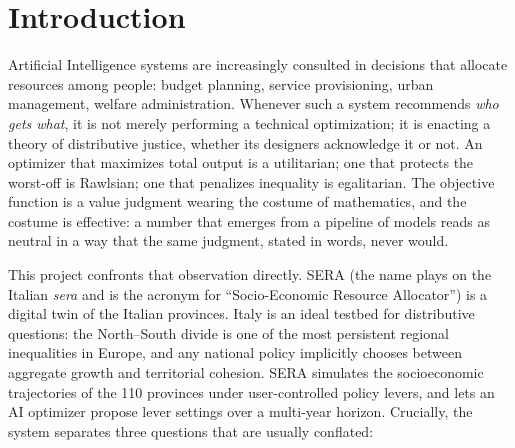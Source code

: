 \documentclass[11pt,a4paper]{article}
\begin{document}
\begin{abstract}
story that dissolved under replication as search luck. The NSGA-II search then
reveals that \emph{uniform} national policy cannot trade efficiency against
inequality at all, while a clustered search that can target regions makes the
trade-off reappear: distributional outcomes are determined by per-province
\emph{targeting}. Read in the dimension that motivated the choice of Italy
(the North--South divide), the frameworks separate cleanly: the utilitarian
tide leaves the gap untouched, maximin closes it by leveling the North down, and
only Sen welfare narrows it while both regions grow. The project's central claim
is that an optimizer always
embodies an ethical framework; SERA's contribution is to make that framework
visible, swappable, and inspectable.
\end{abstract}

\tableofcontents
\newpage

\section{Introduction}

Artificial Intelligence systems are increasingly consulted in decisions that
allocate resources among people: budget planning, service provisioning, urban
management, welfare administration. Whenever such a system recommends \emph{who
gets what}, it is not merely performing a technical optimization; it is
enacting a theory of distributive justice, whether its designers acknowledge it
or not. An optimizer that maximizes total output is a utilitarian; one that
protects the worst-off is Rawlsian; one that penalizes inequality is
egalitarian. The objective function is a value judgment wearing the costume of
mathematics, and the costume is effective: a number that emerges from a
pipeline of models reads as neutral in a way that the same judgment, stated in
words, never would.

This project confronts that observation directly. SERA (the name plays on the
Italian \emph{sera} and is the acronym for ``Socio-Economic Resource Allocator'') is a digital twin of the Italian provinces. Italy is an ideal
testbed for distributive questions: the North--South divide is one of the most
persistent regional inequalities in Europe, and any national policy implicitly
chooses between aggregate growth and territorial cohesion. SERA simulates the
socioeconomic trajectories of the 110 provinces under user-controlled policy
levers, and lets an AI optimizer propose lever settings over a multi-year
horizon. Crucially, the system separates three questions that are usually
conflated:
\end{document}
